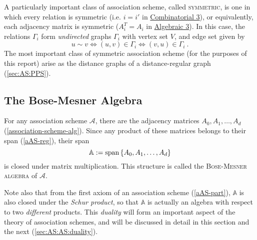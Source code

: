 \documentclass{report}
\newcommand{\AS}{\mathcal{A}}
\newcommand{\BMA}{\mathbb{A}}
\begin{document}
    A particularly important class of association scheme, called
    \textsc{symmetric}, is one in which every relation is symmetric (i.e. $i =
    i'$ in \hyperref[cAS-sym]{Combinatorial 3}), or equivalently, each adjacency
    matrix is symmetric ($A_i^T = A_i$ in \hyperref[aAS-sym]{Algebraic 3}).
    In this case, the relations $\Gamma_i$ form \textit{undirected} graphs $\Gamma_i$
    with vertex set $V$, and edge set given by
    $$
      u \sim v \iff (u, v) \in \Gamma_i \iff (v, u) \in \Gamma_i
      \ .
    $$
    The most important class of symmetric association scheme (for the purposes
    of this report) arise as the distance graphs of a distance-regular graph
    (\ref{sec:AS:PPS}).

    \subsection{The Bose-Mesner Algebra}\label{sec:AS:AS:BMA}
      For any association scheme $\AS$,
      there are the adjacency matrices
      $A_0, A_1, \ldots, A_d$ (\ref{association-scheme-alg}).
      Since any product of these matrices belongs to their span (\ref{aAS-reg}),
      their span
      \begin{equation}\label{BMA}
        \BMA := \Span\set{A_0, A_1, \ldots, A_d}
      \end{equation}
      is closed under matrix multiplication.  This structure is called the
      \textsc{Bose-Mesner algebra} of $\AS$.

      Note also that from the first axiom of an association scheme
      (\ref{aAS-part}), $\BMA$ is also closed under the \textit{Schur product},
      so that $\BMA$ is actually an algebra with respect to two
      \textit{different} products.
      This \textit{duality} will form an important aspect of the theory of
      association schemes, and will be discussed in detail in this section and
      the next (\ref{sec:AS:AS:duality}).
\end{document}
